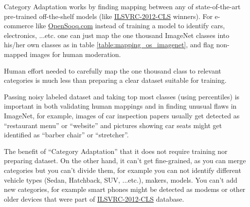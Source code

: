 Category Adaptation works by finding mapping between 
any of state-of-the-art pre-trained off-the-shelf models
(like \href{http://www.image-net.org/challenges/LSVRC/2012/}{ILSVRC-2012-CLS} winners).
For e-commerce like \href{http://opensooq.com}{OpenSooq.com} 
instead of training a model to identify cars, electronics, ...etc.
one can just map the one thousand ImageNet classes into his/her own classes as in table \ref{table:mapping_os_imagenet},
and flag non-mapped images for human moderation.

Human effort needed to carefully map the one thousand class to relevant categories
is much less than preparing a clear dataset suitable for training.

Passing noisy labeled dataset and taking top most classes (using percentiles) is important in both validating human mappings
and in finding unusual flaws in ImageNet,
for example, images of car inspection papers usually get detected as ``restaurant menu'' or ``website''
and pictures showing car seats might get identified as ``barber chair'' or ``stretcher''.

The benefit of ``Category Adaptation'' that it does not require training nor preparing dataset.
On the other hand, it can't get fine-grained, as you can merge categories but you can't divide them,
for example you can not identify different vehicle types (Sedan, Hatchback, SUV, ...etc.), makers, models.
You can't add new categories, for example smart phones might be detected as modems or other older devices that
were part of \href{http://www.image-net.org/challenges/LSVRC/2012/}{ILSVRC-2012-CLS} database\autocite{deng2012imagenet}.


